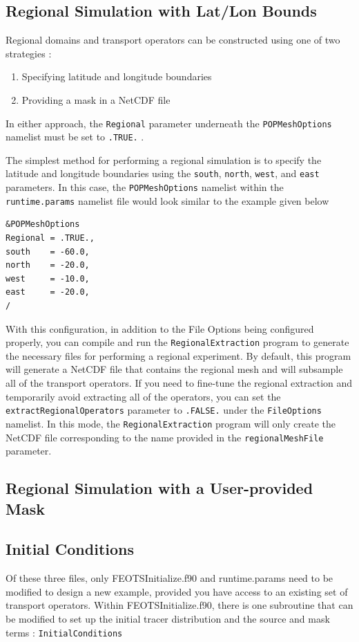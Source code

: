 \documentclass{softwaremanual}
\begin{document}
\subsection{Regional Simulation with Lat/Lon Bounds}
Regional domains and transport operators can be constructed using one of two strategies :
\begin{enumerate}
\item Specifying latitude and longitude boundaries
\item Providing a mask in a NetCDF file
\end{enumerate} 
In either approach, the \texttt{Regional} parameter underneath the \texttt{POPMeshOptions} namelist must be set to \texttt{.TRUE.} .

 The simplest method for performing a regional simulation is to specify the latitude and longitude boundaries using the \texttt{south}, \texttt{north}, \texttt{west}, and \texttt{east} parameters. In this case, the \texttt{POPMeshOptions} namelist within the \texttt{runtime.params} namelist file would look similar to the example given below
\begin{verbatim}
&POPMeshOptions
Regional = .TRUE.,
south    = -60.0,
north    = -20.0,
west     = -10.0,
east     = -20.0,
/
\end{verbatim}
With this configuration, in addition to the File Options being configured properly, you can compile and run the \texttt{RegionalExtraction} program to generate the necessary files for performing a regional experiment. By default, this program will generate a NetCDF file that contains the regional mesh and will subsample all of the transport operators. If you need to fine-tune the regional extraction and temporarily avoid extracting all of the operators, you can set the \texttt{extractRegionalOperators} parameter to \texttt{.FALSE.} under the \texttt{FileOptions} namelist. In this mode, the \texttt{RegionalExtraction} program will only create the NetCDF file corresponding to the name provided in the \texttt{regionalMeshFile} parameter.

\subsection{Regional Simulation with a User-provided Mask}

\subsection{Initial Conditions}
Of these three files, only FEOTSInitialize.f90 and runtime.params need to be modified to design a new example, provided you have access to an existing set of transport operators. Within FEOTSInitialize.f90, there is one subroutine that can be modified to set up the initial tracer distribution and the source and mask terms  : \texttt{InitialConditions}
\end{document}
